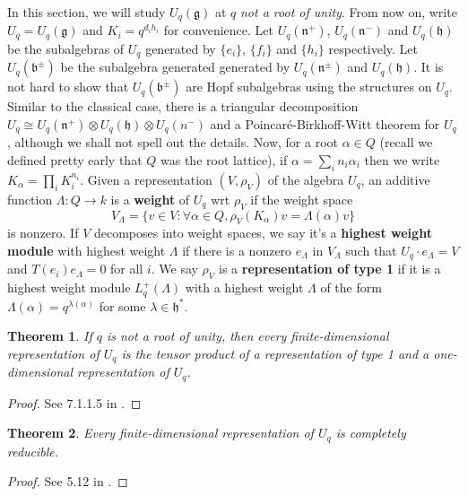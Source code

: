 \documentclass[11pt, a4paper]{article}
\newtheorem{theorem}{Theorem}[subsection]
\theoremstyle{definition}
\newcommand{\h}{\mathfrak h}
\renewcommand{\b}{\mathfrak b}
\newcommand{\g}{\mathfrak g}
\begin{document}
    In this section, we will study $U_q(\g)$ at $q$ \textit{not a root of unity}. From now on, write $U_q=U_q(\g)$ and $K_i=q^{d_ih_i}$ for convenience. Let $U_q(\mathfrak n^+)$, $U_q(\mathfrak n^-)$ and $U_q(\h)$ be the subalgebras of $U_q$ generated by $\{e_i\}$, $\{f_i\}$ and $\{h_i\}$ respectively. Let $U_q(\b^\pm)$ be the subalgebra generated generated by $U_q(\mathfrak n^\pm)$ and $U_q(\h)$. It is not hard to show that $U_q(\b^\pm)$ are Hopf subalgebras using the structures on $U_q$. Similar to the classical case, there is a triangular decomposition $U_q\cong U_q(\mathfrak n^+)\otimes U_q(\h)\otimes U_q(n^-)$ and a Poincaré-Birkhoff-Witt theorem for $U_q$, although we shall not spell out the details. Now, for a root $\alpha\in Q$ (recall we defined pretty early that $Q$ was the root lattice), if $\alpha=\sum_i n_i\alpha_i$ then we write $K_\alpha=\prod_i K_i^{n_i}$. Given a representation $(V, \rho_V)$ of the algebra $U_q$, an additive function $\Lambda:Q\to k$ is a \textbf{weight} of $U_q$ wrt $\rho_V$ if the weight space
    \[V_\Lambda=\{v\in V:\forall \alpha\in Q, \rho_V(K_\alpha)v=\Lambda(\alpha)v\}\]
    is nonzero. If $V$ decomposes into weight spaces, we say it's a \textbf{highest weight module} with highest weight $\Lambda$ if there is a nonzero $e_{\Lambda}$ in $V_\Lambda$ such that $U_q\cdot e_{\Lambda}=V$ and $T(e_i)e_\Lambda=0$ for all $i$. We say $\rho_V$ is a \textbf{representation of type 1} if it is a highest weight module $L^+_q(\Lambda)$ with a highest weight $\Lambda$ of the form $\Lambda(\alpha)=q^{\lambda(\alpha)}$ for some $\lambda\in\h^*$.
    \begin{theorem}
        If $q$ is not a root of unity, then every finite-dimensional representation of $U_q$ is the tensor product of a representation of type 1 and a one-dimensional representation of $U_q$.
    \end{theorem}
    \begin{proof}
        See 7.1.1.5 in \cite{klimyk-uq-rep}.
    \end{proof}
    \begin{theorem}
        Every finite-dimensional representation of $U_q$ is completely reducible.
    \end{theorem}
    \begin{proof}
        See 5.12 in \cite{MR1198203}.
    \end{proof}
\end{document}
